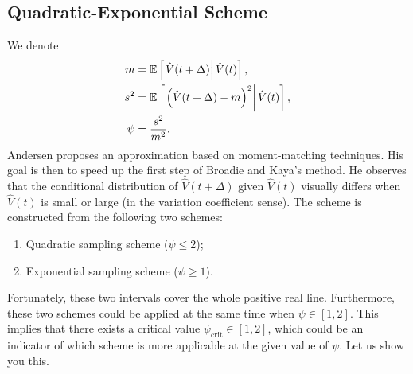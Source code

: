         \subsection{Quadratic-Exponential Scheme}
            We denote 
            \begin{align}
                m    &= \mathbb{E}\left[\left.\hat{V}(t+\Delta)\right| \hat{V}(t)\right], \label{Andersen:mean}\\
                s^2  &= \mathbb{E}\left[\left.\left(\hat{V}(t+\Delta) - m\right)^2\right| \hat{V}(t)\right], \\
                \psi &= \frac{s^2}{m^2}.\label{Andersen:CV}
            \end{align}
            Andersen proposes an approximation based on moment-matching techniques. His goal is then to speed up the 
            first step of Broadie and Kaya's method.
            He observes that the conditional distribution of $\hat{V}(t+\Delta)$ given $\hat{V}(t)$ visually differs 
            when $\hat{V}(t)$ is small or large (in the variation coefficient sense).
            The scheme is constructed from the following two schemes:
            \begin{enumerate}
                \item Quadratic sampling scheme ($\psi \leq 2$);
                \item Exponential sampling scheme ($\psi \geq 1$).
            \end{enumerate}
            Fortunately, these two intervals cover the whole positive real line. Furthermore, these two schemes could 
            be applied at the same time when $\psi\in[1, 2]$. This implies that there exists a critical value 
            $\psi_{\text{crit}}\in[1, 2]$, which could be an indicator of which scheme is more applicable at the 
            given value of $\psi$. Let us show you this.
